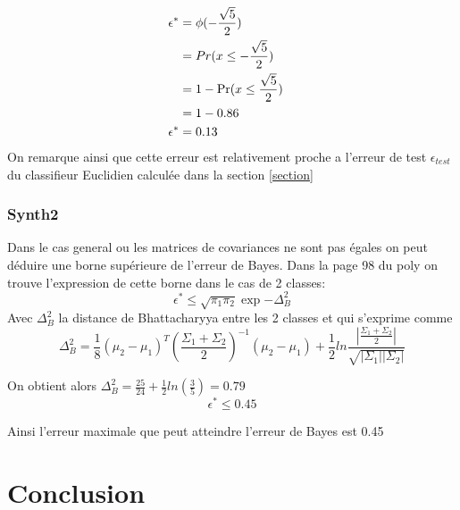 \documentclass[10pt]{article}
\begin{document}
\begin{align}
 \epsilon^{*}  &=  \phi(-\frac{\sqrt{5}}{2}) \cr
& =  Pr(x \leq -\frac{\sqrt{5}}{2}) \cr
 &= 1 - \Pr(x \leq \frac{\sqrt{5}}{2})\cr
 & = 1 - 0.86\cr
 \epsilon^{*}  & = 0.13
\end{align}
On remarque ainsi que cette erreur est relativement proche a l'erreur de test $\epsilon_{test}$ du classifieur Euclidien calculée dans la section \ref{section}



\subsubsection{Synth2}
Dans le cas general ou les matrices de covariances ne sont pas égales on peut déduire une borne supérieure de l'erreur de Bayes. Dans la page 98 du  poly on trouve l'expression de cette borne dans le  cas de 2 classes:
\[ \epsilon^{*} \leq \sqrt{\pi_{1}\pi_{2}}  \exp{-\Delta_{B}^{2}} \]
Avec $\Delta_{B}^{2}$ la distance de Bhattacharyya entre les 2 classes et qui s'exprime comme 
\[  \Delta_{B}^{2} = \frac{1}{8} (\mu_{2} - \mu_{1})^{T}  (\frac{\Sigma_{1} + \Sigma_{2}}{2})^{-1} (\mu_{2} - \mu_{1}) + 
\frac{1}{2} ln\frac{|\frac{\Sigma_{1}+\Sigma_{2}}{2}|}{\sqrt{|\Sigma_{1}| |\Sigma_{2}|}} \]

On obtient alors $\Delta_{B}^{2} = \frac{25}{24} +\frac{1}{2} ln(\frac{3}{5} ) = 0.79$
\[  \epsilon^{*} \leq 0.45\]

Ainsi l'erreur maximale que peut atteindre l'erreur de Bayes est 0.45

\section{Conclusion}
	
\end{document}
